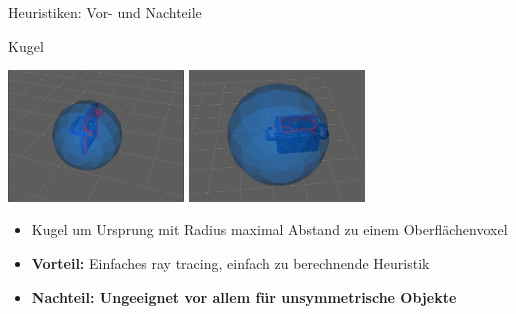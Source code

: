 \documentclass[aspectratio=169]{beamer}
\begin{document}
\begin{frame}{Heuristiken: Vor- und Nachteile}
	\begin{block}{Kugel}
		\begin{center}
			\includegraphics[width=0.35\textwidth]{Graphics/sphere_ok.png}
			\includegraphics[width=0.35\textwidth]{Graphics/sphere_too_big.png}
		\end{center}
		\begin{itemize}
			\item Kugel um Ursprung mit Radius maximal Abstand zu einem Oberflächenvoxel
			\item \textbf{Vorteil:} Einfaches ray tracing, einfach zu berechnende Heuristik
			\item \textbf{Nachteil: Ungeeignet vor allem für unsymmetrische Objekte}
		\end{itemize}
	\end{block}
\end{frame}
\end{document}

